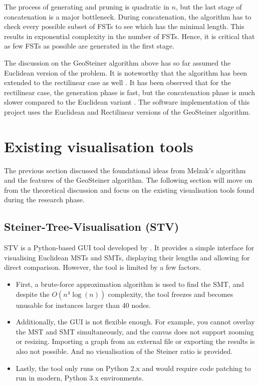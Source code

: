 \documentclass{l4proj}
\begin{document}
The process of generating and pruning is quadratic in $n$, but the last stage of concatenation is a major bottleneck. During concatenation, the algorithm has to check every possible subset of FSTs to see which has the minimal length. This results in exponential complexity in the number of FSTs. Hence, it is critical that as few FSTs as possible are generated in the first stage.

The discussion on the GeoSteiner algorithm above has so far assumed the Euclidean version of the problem. It is noteworthy that the algorithm has been extended to the rectilinear case as well \citep{rectilinear_geosteiner}. It has been observed that for the rectilinear case, the generation phase is fast, but the concatenation phase is much slower compared to the Euclidean variant \citep{29ee725d11ac4584b72f7fe66c4326fa}.
The software implementation of this project uses the Euclidean and Rectilinear versions of the GeoSteiner algorithm.


\section{Existing visualisation tools}
\label{sec:existing_tools}
The previous section discussed the foundational ideas from Melzak's algorithm and the features of the GeoSteiner algorithm. The following section will move on from the theoretical discussion and focus on the existing visualisation tools found during the research phase.

\subsection{Steiner-Tree-Visualisation (STV)}
STV is a Python-based GUI tool developed by \cite{Steiner-Tree-Visualisation}. It provides a simple interface for visualising Euclidean MSTs and SMTs, displaying their lengths and allowing for direct comparison. However, the tool is limited by a few factors.
\begin{itemize}
    \item First, a brute-force approximation algorithm is used to find the SMT, and despite the ${O(n^4 \log(n))}$ complexity, the tool freezes and becomes unusable for instances larger than 40 nodes.
    \item Additionally, the GUI is not flexible enough. For example, you cannot overlay the MST and SMT simultaneously, and the canvas does not support zooming or resizing. Importing a graph from an external file or exporting the results is also not possible. And no visualisation of the Steiner ratio is provided.
    \item Lastly, the tool only runs on Python 2.x and would require code patching to run in modern, Python 3.x environments.
\end{itemize}
\end{document}
